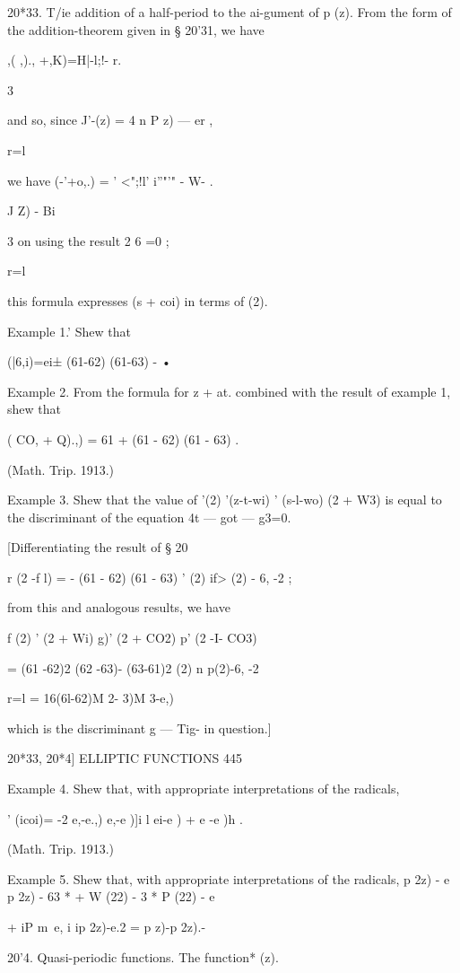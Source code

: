 {20*33. T/ie addition of a half-period to the ai-gument of p (z). From
the form of the addition-theorem given in § 20'31, we have

,( ,)., +,K)=H|-l;!- r.

3

and so, since J'-(z) = 4 n P z) — er ,

r=l

we have (-'+o,.) = ' <";!l' i''"'" - W- .

 J Z) - Bi

3 on using the result 2 6 =0 ;

r=l

this formula expresses (s + coi) in terms of (2).

Example 1.' Shew that

  (|6,i)=ei± (61-62) (61-63) - •

Example 2. From the formula for z + at. combined with the result of
example 1, shew that

  ( CO, + Q).,) = 61 + (61 - 62) (61 - 63) .

(Math. Trip. 1913.)

Example 3. Shew that the value of '(2) '(z-t-wi) ' (s-l-wo) (2 + W3)
is equal to the discriminant of the equation 4t — got — g3=0.

[Differentiating the result of § 20%

r (2 -f l) = - (61 - 62) (61 - 63) ' (2) if> (2) - 6, -2 ;

from this and analogous results, we have

f (2) ' (2 + Wi) g)' (2 + CO2) p' (2 -I- CO3)

= (61 -62)2 (62 -63)- (63-61)2 (2) n p(2)-6, -2

r=l = 16(6l-62)M 2- 3)M 3-e,)

which is the discriminant g — Tig- in question.]

20*33, 20*4] ELLIPTIC FUNCTIONS 445

Example 4. Shew that, with appropriate interpretations of the
radicals,

 ' (icoi)= -2 e,-e.,) e,-e )]i l ei-e ) + e -e )h .

(Math. Trip. 1913.)

Example 5. Shew that, with appropriate interpretations of the
radicals, p 2z) - e p 2z) - 63 * + W (22) - 3 * P (22) - e

+ iP m~e, i ip 2z)-e.2 = p z)-p 2z).-

20'4. Quasi-periodic functions. The function* (z).

}
